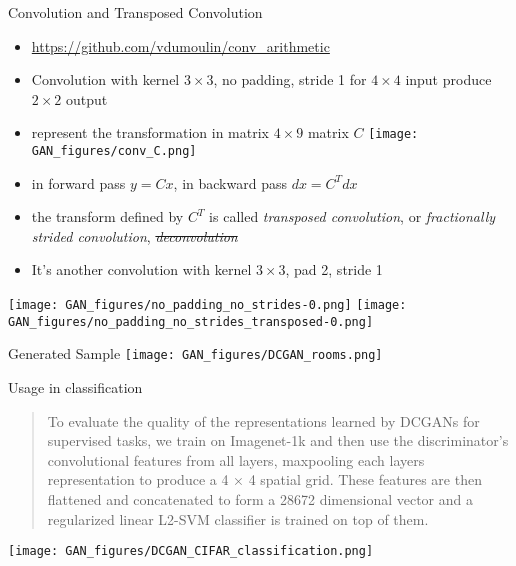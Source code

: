 \documentclass[9pt]{beamer}
\begin{document}
\begin{frame}{Convolution and Transposed Convolution}
  \begin{itemize}
  \item \url{https://github.com/vdumoulin/conv_arithmetic}
  \item Convolution with kernel $3\times 3$, no padding, stride 1 for $4\times 4$ input produce $2\times 2$ output
  \item represent the transformation in matrix $4\times 9$ matrix $C$
  \texttt{[image: GAN\_figures/conv\_C.png]}
  \item in forward pass $y=C x$, in backward pass $dx = C^T dx$
  \item the transform defined by $C^T$ is called \emph{transposed convolution}, or \emph{fractionally strided convolution}, \sout{\emph{deconvolution}}
  \item It's another convolution with kernel $3\times 3$, pad 2, stride 1
  \end{itemize}

  \begin{center}
    \texttt{[image: GAN\_figures/no\_padding\_no\_strides-0.png]}
    \texttt{[image: GAN\_figures/no\_padding\_no\_strides\_transposed-0.png]}
  \end{center}
\end{frame}

\begin{frame}{Generated Sample}
  \texttt{[image: GAN\_figures/DCGAN\_rooms.png]}
\end{frame}

\begin{frame}{Usage in classification}
  \begin{quote} To evaluate the quality of the representations
    learned by DCGANs for supervised tasks, we train on Imagenet-1k
    and then use the discriminator’s convolutional features from all
    layers, maxpooling each layers representation to produce a 4 × 4
    spatial grid. These features are then flattened and concatenated
    to form a 28672 dimensional vector and a regularized linear L2-SVM
    classifier is trained on top of them.
  \end{quote}
  \begin{center}
    \texttt{[image: GAN\_figures/DCGAN\_CIFAR\_classification.png]}
  \end{center}
\end{frame}
\end{document}
